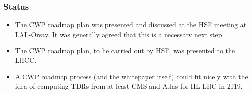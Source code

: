 \begin{frame}
\frametitle{Status}

\begin{itemize}
\item The CWP roadmap plan was presented and discussed at the HSF meeting at LAL-Orsay. It was generally agreed that this is a necessary next step.
\item The CWP roadmap plan, to be carried out by HSF, was presented to the LHCC.
\item A CWP roadmap process (and the whitepaper itself) could fit nicely with the idea of computing TDRs from at least CMS and Atlas for HL-LHC in 2019.
\end{itemize}

\end{frame}


